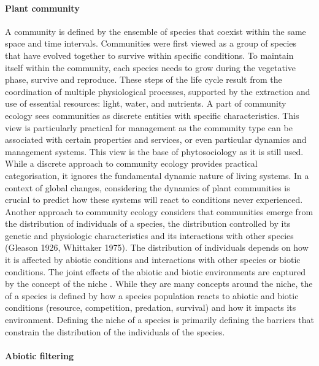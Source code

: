 \paragraph{Plant community}

A community is defined by the ensemble of species that coexist within the same space and time intervals. Communities were first viewed as a group of species that have evolved together to survive within specific conditions. To maintain itself within the community, each species needs to grow during the vegetative phase, survive and reproduce. These steps of the life cycle result from the coordination of multiple physiological processes, supported by the extraction and use of essential resources: light, water, and nutrients. A part of community ecology sees communities as discrete entities with specific characteristics. This view is particularly practical for management as the community type can be associated with certain properties and services, or even particular dynamics and management systems. This view is the base of phytosociology as it is still used. While a discrete approach to community ecology provides practical categorisation, it ignores the fundamental dynamic nature of living systems. In a context of global changes, considering the dynamics of plant communities is crucial to predict how these systems will react to conditions never experienced. Another approach to community ecology considers that communities emerge from the distribution of individuals of a species, the distribution controlled by its genetic and physiologic characteristics and its interactions with other species (Gleason 1926, Whittaker 1975). The distribution of individuals depends on how it is affected by abiotic conditions and interactions with other species or biotic conditions. The joint effects of the abiotic and biotic environments are captured by the concept of the niche \parencite{elton_animal_1971}. While they are many concepts around the niche, the  of a species is defined by how a species population reacts to abiotic and biotic conditions (resource, competition, predation, survival) and how it impacts its environment. Defining the niche of a species is primarily defining the barriers that constrain the distribution of the individuals of the species.



\paragraph{Abiotic filtering}

